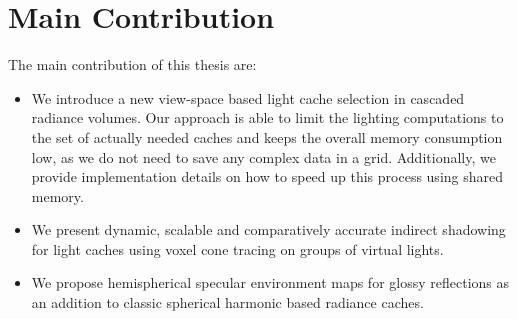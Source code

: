 \documentclass[thesis.tex]{subfiles}
\begin{document}



\section{Main Contribution}
The main contribution of this thesis are:
\begin{itemize}
\item We introduce a new view-space based light cache selection in cascaded radiance volumes. Our approach is able to limit the lighting computations to the set of actually needed caches and keeps the overall memory consumption low, as we do not need to save any complex data in a grid. Additionally, we provide implementation details on how to speed up this process using shared memory.
\item We present dynamic, scalable and comparatively accurate indirect shadowing for light caches using voxel cone tracing on groups of virtual lights.
\item We propose hemispherical specular environment maps for glossy reflections as an addition to classic spherical harmonic based radiance caches.
\end{itemize}

\end{document}
